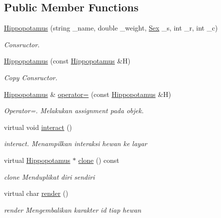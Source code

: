\subsection*{Public Member Functions}
\begin{DoxyCompactItemize}
\item 
\hyperlink{classHippopotamus_a2720f3349f57891bdd17c77b175b80a0}{Hippopotamus} (string \+\_\+name, double \+\_\+weight, \hyperlink{sex_8h_a2633cb393c68bb2ee8080db58fb7ba93}{Sex} \+\_\+s, int \+\_\+r, int \+\_\+c)
\begin{DoxyCompactList}\small\item\em Consructor. \end{DoxyCompactList}\item 
\hyperlink{classHippopotamus_a886733b750749ccf280d92cf14f1663e}{Hippopotamus} (const \hyperlink{classHippopotamus}{Hippopotamus} \&H)
\begin{DoxyCompactList}\small\item\em Copy Consructor. \end{DoxyCompactList}\item 
\hyperlink{classHippopotamus}{Hippopotamus} \& \hyperlink{classHippopotamus_ac6100e48b9175195a62f9652db5d7ce0}{operator=} (const \hyperlink{classHippopotamus}{Hippopotamus} \&H)
\begin{DoxyCompactList}\small\item\em Operator=. Melakukan assignment pada objek. \end{DoxyCompactList}\item 
virtual void \hyperlink{classHippopotamus_a36896f7daf07dbdf68153f371c2e5890}{interact} ()
\begin{DoxyCompactList}\small\item\em interact. Menampilkan interaksi hewan ke layar \end{DoxyCompactList}\item 
virtual \hyperlink{classHippopotamus}{Hippopotamus} $\ast$ \hyperlink{classHippopotamus_ae332973578e7a9a8bfde9cd7fb972d5e}{clone} () const 
\begin{DoxyCompactList}\small\item\em clone Menduplikat diri sendiri \end{DoxyCompactList}\item 
virtual char \hyperlink{classHippopotamus_a55c661408859ea2b5225931592b6d8e4}{render} ()
\begin{DoxyCompactList}\small\item\em render Mengembalikan karakter id tiap hewan \end{DoxyCompactList}\item 

\end{DoxyCompactItemize}
